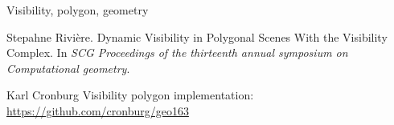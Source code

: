 \documentclass[10pt,preprint]{sigplanconf}
\begin{document}


\keywords
Visibility, polygon, geometry













\begin{thebibliography}{}
\softraggedright



Stepahne Rivière.
Dynamic Visibility in Polygonal Scenes With the Visibility Complex.
In \emph{SCG Proceedings of the thirteenth annual symposium on Computational geometry}.

Karl Cronburg
Visibility polygon implementation:
\href{https://github.com/cronburg/geo163}{https://github.com/cronburg/geo163}

\end{thebibliography}
\end{document}
